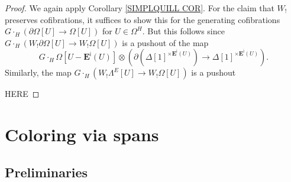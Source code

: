 \documentclass[a4paper,10pt
,draft
]{article}%
\renewcommand{\1}{\ensuremath{\mathbb{id}}}
\begin{document}
\begin{proof}
	We again apply Corollary \ref{SIMPLQUILL COR}.
	For the claim that $W_!$ preserves cofibrations,
	it suffices to show this for the generating cofibrations
	$G\cdot_H \left( \partial \Omega[U] \to \Omega[U] \right)$ for $U \in \Omega^H$.
	But this follows since 
	$G \cdot_H \left(W_! \partial \Omega[U] \to W_! \Omega[U] \right)$
	is a pushout of the map
\[
	G \cdot_H \Omega[U - \boldsymbol{E}^{\mathsf{i}}(U)]
\otimes
	\left(
	\partial \left( \Delta[1]^{\times \boldsymbol{E}^{\mathsf{i}}(U) } \right) 
		\to
	\Delta[1]^{\times \boldsymbol{E}^{\mathsf{i}}(U) }
	\right).
\]
Similarly, the map
	$G \cdot_H \left(W_! \Lambda^E[U] \to W_! \Omega[U] \right)$
is a pushout 


{\color{red} HERE}
	
\end{proof}




\section{Coloring via spans}


\subsection{Preliminaries}
\end{document}
